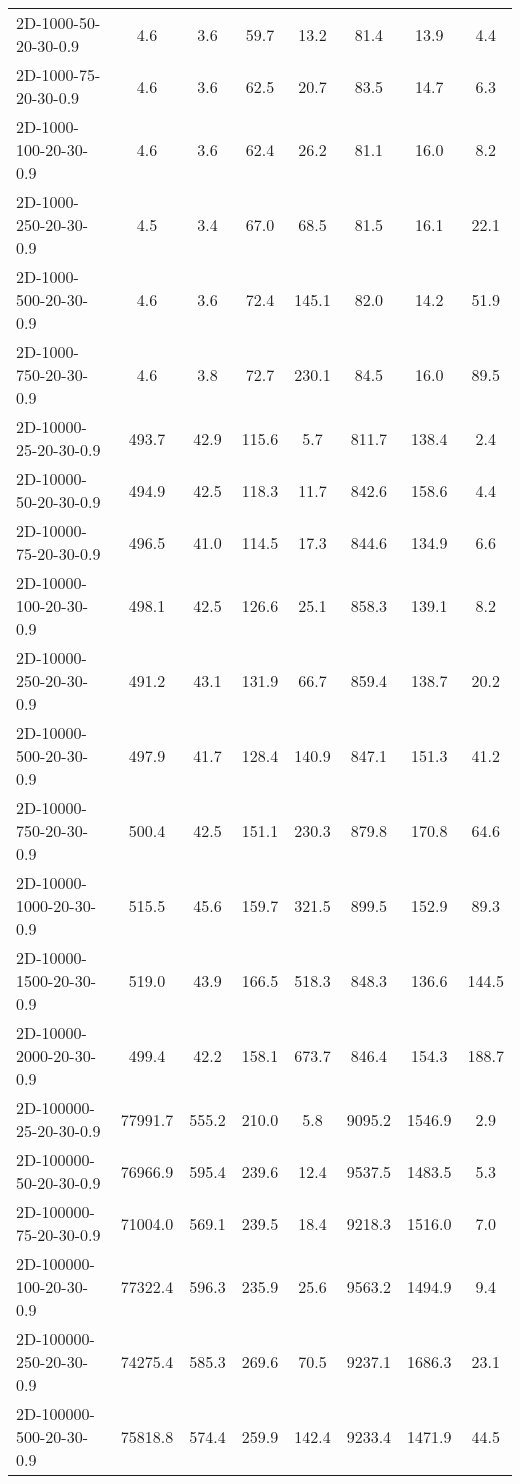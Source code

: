 \documentclass{article}
\begin{document}
\begin{center}
\begin{table}[h]
\begin{tabular}{|l||c|c|c|c|c|c|c|}
    2D-1000-50-20-30-0.9 & 4.6 & 3.6 & 59.7 & 13.2 & 81.4 & 13.9 & 4.4 \\
    2D-1000-75-20-30-0.9 & 4.6 & 3.6 & 62.5 & 20.7 & 83.5 & 14.7 & 6.3 \\
    2D-1000-100-20-30-0.9 & 4.6 & 3.6 & 62.4 & 26.2 & 81.1 & 16.0 & 8.2 \\
    2D-1000-250-20-30-0.9 & 4.5 & 3.4 & 67.0 & 68.5 & 81.5 & 16.1 & 22.1 \\
    2D-1000-500-20-30-0.9 & 4.6 & 3.6 & 72.4 & 145.1 & 82.0 & 14.2 & 51.9 \\
    2D-1000-750-20-30-0.9 & 4.6 & 3.8 & 72.7 & 230.1 & 84.5 & 16.0 & 89.5 \\
    \hline
    2D-10000-25-20-30-0.9 & 493.7 & 42.9 & 115.6 & 5.7 & 811.7 & 138.4 & 2.4 \\
    2D-10000-50-20-30-0.9 & 494.9 & 42.5 & 118.3 & 11.7 & 842.6 & 158.6 & 4.4 \\
    2D-10000-75-20-30-0.9 & 496.5 & 41.0 & 114.5 & 17.3 & 844.6 & 134.9 & 6.6 \\
    2D-10000-100-20-30-0.9 & 498.1 & 42.5 & 126.6 & 25.1 & 858.3 & 139.1 & 8.2 \\
    2D-10000-250-20-30-0.9 & 491.2 & 43.1 & 131.9 & 66.7 & 859.4 & 138.7 & 20.2 \\
    2D-10000-500-20-30-0.9 & 497.9 & 41.7 & 128.4 & 140.9 & 847.1 & 151.3 & 41.2 \\
    2D-10000-750-20-30-0.9 & 500.4 & 42.5 & 151.1 & 230.3 & 879.8 & 170.8 & 64.6 \\
    2D-10000-1000-20-30-0.9 & 515.5 & 45.6 & 159.7 & 321.5 & 899.5 & 152.9 & 89.3 \\
    2D-10000-1500-20-30-0.9 & 519.0 & 43.9 & 166.5 & 518.3 & 848.3 & 136.6 & 144.5 \\
    2D-10000-2000-20-30-0.9 & 499.4 & 42.2 & 158.1 & 673.7 & 846.4 & 154.3 & 188.7 \\
    \hline
    2D-100000-25-20-30-0.9 & 77991.7 & 555.2 & 210.0 & 5.8 & 9095.2 & 1546.9 & 2.9 \\
    2D-100000-50-20-30-0.9 & 76966.9 & 595.4 & 239.6 & 12.4 & 9537.5 & 1483.5 & 5.3 \\
    2D-100000-75-20-30-0.9 & 71004.0 & 569.1 & 239.5 & 18.4 & 9218.3 & 1516.0 & 7.0 \\
    2D-100000-100-20-30-0.9 & 77322.4 & 596.3 & 235.9 & 25.6 & 9563.2 & 1494.9 & 9.4 \\
    2D-100000-250-20-30-0.9 & 74275.4 & 585.3 & 269.6 & 70.5 & 9237.1 & 1686.3 & 23.1 \\
    2D-100000-500-20-30-0.9 & 75818.8 & 574.4 & 259.9 & 142.4 & 9233.4 & 1471.9 & 44.5 \\

\end{tabular}
\end{table}
\end{center}
\end{document}
